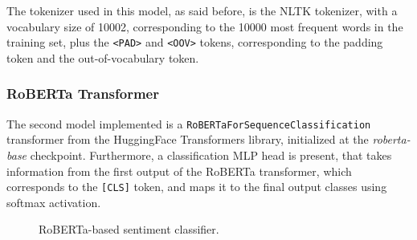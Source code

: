             The tokenizer used in this model, as said before, is the NLTK tokenizer,
            with a vocabulary size of 10002, corresponding to the 10000 most
            frequent words in the training set, plus the \texttt{<PAD>} and \texttt{<OOV>} tokens,
            corresponding to the padding token and the out-of-vocabulary token.


        \subsubsection{RoBERTa Transformer}
        \label{subsubsec:roberta}
            The second model implemented is a \texttt{RoBERTaForSequenceClassification} transformer
            from the HuggingFace Transformers library, initialized at the \textit{roberta-base} 
            checkpoint. Furthermore, a classification MLP head is present, that takes information 
            from the first output of the RoBERTa transformer, which corresponds to the 
            \texttt{[CLS]} token, and maps it to the final output classes using softmax activation.

            \begin{figure}[H]
                \centering
                \caption{RoBERTa-based sentiment classifier.}
            \end{figure}

